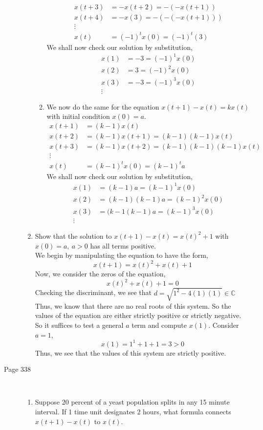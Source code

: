 \documentclass[letterpaper,10pt]{article}
\newcommand{\C}{\mathbb{C}}
\begin{document}
\begin{description}
\begin{enumerate}
\begin{enumerate}
\begin{align*}
x(t+3)&=-x(t+2)=-(-x(t+1))\\
x(t+4)&=-x(3)=-(-(-x(t+1)))\\
\vdots\\
x(t)&=(-1)^tx(0)=(-1)^t(3)
\end{align*}
We shall now check our solution by substitution,
\begin{align*}
x(1)&=-3=(-1)^1x(0)\\
x(2)&=3=(-1)^2x(0)\\
x(3)&=-3=(-1)^3x(0)\\
\vdots
\end{align*}
\item We now do the same for the equation $x(t+1)-x(t)=kx(t)$ with initial condition $x(0)=a$.
\begin{align*}
x(t+1)&=(k-1)x(t)\\
x(t+2)&=(k-1)x(t+1)=(k-1)(k-1)x(t)\\
x(t+3)&=(k-1)x(t+2)=(k-1)(k-1)(k-1)x(t)\\
\vdots\\
x(t)&=(k-1)^tx(0)=(k-1)^ta
\end{align*}
We shall now check our solution by substitution,
\begin{align*}
x(1)&=(k-1)a=(k-1)^1x(0)\\
x(2)&=(k-1)(k-1)a=(k-1)^2x(0)\\
x(3)&=(k-1(k-1)a=(k-1)^3x(0)\\
\vdots
\end{align*}
\end{enumerate}
\item Show that the solution to $x(t+1)-x(t)=x(t)^2+1$ with $x(0)=a,\ a>0$ has all terms positive.\\
We begin by manipulating the equation to have the form,
\[x(t+1)=x(t)^2+x(t)+1\]
Now, we consider the zeros of the equation,
\[x(t)^2+x(t)+1=0\]
Checking the discriminant, we see that $d=\sqrt{1^2-4(1)(1)}\in\C$ Thus, we know that there are no real roots of this system. So the values of the equation are either strictly positive or strictly negative. So it suffices to test a general $a$ term and compute $x(1)$. Consider $a=1$,
\[x(1)=1^1+1+1=3>0\]
Thus, we see that the values of this system are strictly positive.
\end{enumerate}
\item[Page 338]\hfill \\
\begin{enumerate}
\item Suppose 20 percent of a yeast population splits in any 15 minute interval. If 1 time unit designates 2 hours, what formula connects $x(t+1)-x(t)$ to $x(t)$.\\

\end{enumerate}
\end{description}
\end{document}

